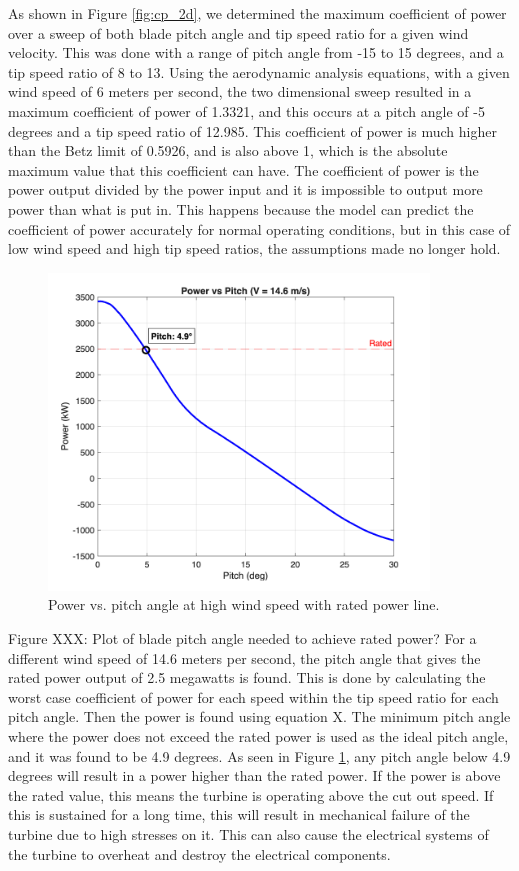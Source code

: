 \documentclass[11pt]{article}
\begin{document}
As shown in Figure \ref{fig:cp_2d}, we determined the maximum coefficient of power over a sweep of both blade pitch angle and tip speed ratio for a given wind velocity. This was done with a range of pitch angle from -15 to 15 degrees, and a tip speed ratio of 8 to 13. Using the aerodynamic analysis equations, with a given wind speed of 6 meters per second, the two dimensional sweep resulted in a maximum coefficient of power of 1.3321, and this occurs at a pitch angle of -5 degrees and a tip speed ratio of 12.985. This coefficient of power is much higher than the Betz limit of 0.5926, and is also above 1, which is the absolute maximum value that this coefficient can have. The coefficient of power is the power output divided by the power input and it is impossible to output more power than what is put in. This happens because the model can predict the coefficient of power accurately for normal operating conditions, but in this case of low wind speed and high tip speed ratios, the assumptions made no longer hold. 
\begin{figure}[ht]
  \centering
  \includegraphics[width=0.9\textwidth]{Deliverable4_Power_vs_Pitch.png}
  \caption{Power vs. pitch angle at high wind speed with rated power line.}
  \label{fig:power_vs_pitch}
\end{figure}
Figure XXX: Plot of blade pitch angle needed to achieve rated power?
For a different wind speed of 14.6 meters per second, the pitch angle that gives the rated power output of 2.5 megawatts is found. This is done by calculating the worst case coefficient of power for each speed within the tip speed ratio for each pitch angle. Then the power is found using equation X. The minimum pitch angle where the power does not exceed the rated power is used as the ideal pitch angle, and it was found to be 4.9 degrees. As seen in Figure \ref{fig:power_vs_pitch}, any pitch angle below 4.9 degrees will result in a power higher than the rated power. If the power is above the rated value, this means the turbine is operating above the cut out speed. If this is sustained for a long time, this will result in mechanical failure of the turbine due to high stresses on it. This can also cause the electrical systems of the turbine to overheat and destroy the electrical components. 
\end{document}
